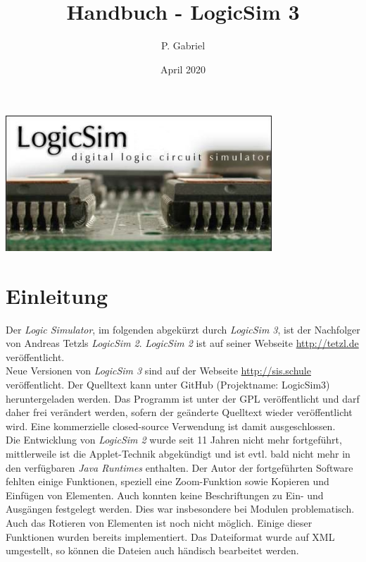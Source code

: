\documentclass[12pt]{scrartcl}
\begin{document}
\newcommand{\lsN}{\textit{LogicSim 3}}
\newcommand{\lsA}{\textit{LogicSim 2}}
\newcommand{\lsbild}[2]{%
\fbox{\texttt{[image: ../src/logicsim/images/\#148]}}
}

\newcommand{\bild}[2]{%
\begin{figure}[htb!]
\centering
\texttt{[image: abbildungen/\#1]}
\caption{#2}
\label{#1}
\end{figure}
}

\title{Handbuch - LogicSim 3}
\author{P. Gabriel}
\date{April 2020}
\vspace*{-11mm}

\begin{center}
\includegraphics[width=10cm]{../src/logicsim/images/about}
\end{center}

\section{Einleitung}
Der \textit{Logic Simulator}, im folgenden abgekürzt durch \lsN{}, ist der Nachfolger von Andreas Tetzls \lsA{}. \lsA{} ist auf seiner Webseite \url{http://tetzl.de} veröffentlicht.\\

Neue Versionen von \lsN{} sind auf der Webseite \url{http://sis.schule} veröffentlicht. Der Quelltext kann unter GitHub (Projektname: LogicSim3) heruntergeladen werden. Das Programm ist unter der GPL veröffentlicht und darf daher frei verändert werden, sofern der geänderte Quelltext wieder veröffentlicht wird. Eine kommerzielle closed-source Verwendung ist damit ausgeschlossen.\\

Die Entwicklung von \lsA{} wurde seit 11 Jahren nicht mehr fortgeführt, mittlerweile ist die Applet-Technik abgekündigt und ist evtl. bald nicht mehr in den verfügbaren \textit{Java Runtimes} enthalten. Der Autor der fortgeführten Software fehlten einige Funktionen, speziell eine Zoom-Funktion sowie Kopieren und Einfügen von Elementen. Auch konnten keine Beschriftungen zu Ein- und Ausgängen festgelegt werden. Dies war insbesondere bei Modulen problematisch. Auch das Rotieren von Elementen ist noch nicht möglich. Einige dieser Funktionen wurden bereits implementiert. Das Dateiformat wurde auf XML umgestellt, so können die Dateien auch händisch bearbeitet werden.\\
\end{document}
